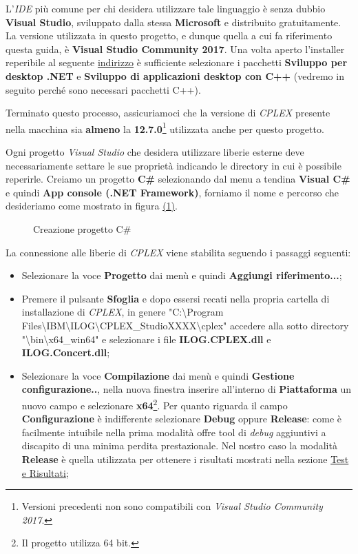 \documentclass[11pt]{article}
\begin{document}
L'\textit{IDE} più comune per chi desidera utilizzare tale linguaggio è senza dubbio \textbf{Visual Studio}, sviluppato dalla stessa \textbf{Microsoft} e distribuito gratuitamente. La versione utilizzata in questo progetto, e dunque quella a cui fa riferimento questa guida, è \textbf{Visual Studio Community 2017}. Una volta aperto l'installer reperibile al seguente \href{https://www.visualstudio.com/it/thank-you-downloading-visual-studio/?sku=Community&rel=15#}{indirizzo} è sufficiente selezionare i pacchetti \textbf{Sviluppo per desktop .NET} e \textbf{Sviluppo di applicazioni desktop con C++} (vedremo in seguito perché sono necessari pacchetti C++).

Terminato questo processo, assicuriamoci che la versione di \textit{CPLEX} presente nella macchina sia \textbf{almeno} la \textbf{12.7.0}\footnote{Versioni precedenti non sono compatibili con \textit{Visual Studio Community 2017}.} utilizzata anche per questo progetto.

Ogni progetto \textit{Visual Studio} che desidera utilizzare liberie esterne deve necessariamente settare le sue proprietà indicando le directory in cui è possibile reperirle. Creiamo un progetto \textbf{C\#} selezionando dal menu a tendina \textbf{Visual C\#} e quindi \textbf{App console (.NET Framework)}, forniamo il nome e percorso che desideriamo come mostrato in figura \hyperref[ProgettoCSharpImg]{(1)}.

\begin{figure}[htbp]
    \centering
    \caption{Creazione progetto C\#}
    \label{ProgettoCSharpImg}
\end{figure}

La connessione alle liberie di \textit{CPLEX} viene stabilita seguendo i passaggi seguenti:

\begin{itemize}
    \item Selezionare la voce \textbf{Progetto} dai menù e quindi \textbf{Aggiungi riferimento...};
    \item Premere il pulsante \textbf{Sfoglia} e dopo essersi recati nella propria cartella di installazione di \textit{CPLEX}, in genere "C:\textbackslash Program Files\textbackslash IBM\textbackslash ILOG\textbackslash CPLEX\_StudioXXXX\textbackslash cplex" accedere alla sotto directory "\textbackslash bin\textbackslash x64\_win64" e selezionare i file \textbf{ILOG.CPLEX.dll} e \textbf{ILOG.Concert.dll};
    \item Selezionare la voce \textbf{Compilazione} dai menù e quindi \textbf{Gestione configurazione..}, nella nuova finestra inserire all'interno di \textbf{Piattaforma} un nuovo campo e selezionare \textbf{x64}\footnote{Il progetto utilizza 64 bit.}. Per quanto riguarda il campo \textbf{Configurazione} è indifferente selezionare \textbf{Debug} oppure \textbf{Release}: come è facilmente intuibile nella prima modalità offre tool di \textit{debug} aggiuntivi a discapito di una minima perdita prestazionale. Nel nostro caso la modalità \textbf{Release} è quella utilizzata per ottenere i risultati mostrati nella sezione \hyperref[sec:TestRisultatiS]{Test e Risultati};
\end{itemize}
\end{document}
